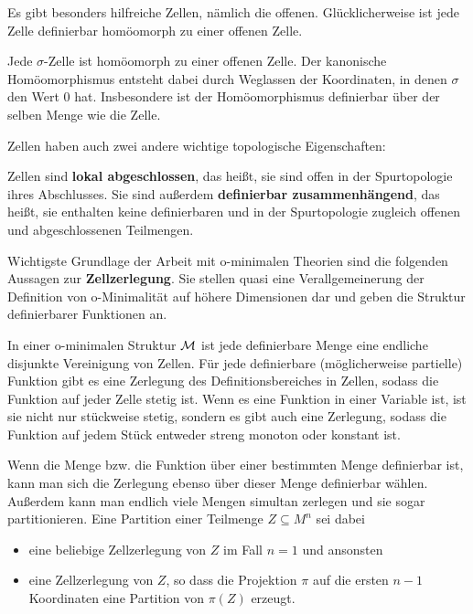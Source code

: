 Es gibt besonders hilfreiche Zellen, nämlich die offenen. Glücklicherweise ist jede Zelle definierbar homöomorph zu einer offenen Zelle.
\begin{fact}
	Jede $\sigma$-Zelle ist homöomorph zu einer offenen Zelle. Der kanonische Homöomorphismus entsteht dabei durch Weglassen der Koordinaten, in denen $\sigma$ den Wert 0 hat. Insbesondere ist der Homöomorphismus definierbar über der selben Menge wie die Zelle.
\end{fact}

Zellen haben auch zwei andere wichtige topologische Eigenschaften:
\begin{fact}
	Zellen sind \textbf{lokal abgeschlossen}, das heißt, sie sind offen in der Spurtopologie ihres Abschlusses. Sie sind außerdem \textbf{definierbar zusammenhängend}, das heißt, sie enthalten keine definierbaren und in der Spurtopologie zugleich offenen und abgeschlossenen Teilmengen.
\end{fact}

Wichtigste Grundlage der Arbeit mit o-minimalen Theorien sind die folgenden Aussagen zur \textbf{Zellzerlegung}. Sie stellen quasi eine Verallgemeinerung der Definition von o-Minimalität auf höhere Dimensionen dar und geben die Struktur definierbarer Funktionen an.
\begin{fact}
	In einer o-minimalen Struktur $\mathcal{M}$ ist jede definierbare Menge eine endliche disjunkte Vereinigung von Zellen. Für jede definierbare (möglicherweise partielle) Funktion gibt es eine Zerlegung des Definitionsbereiches in Zellen, sodass die Funktion auf jeder Zelle stetig ist. Wenn es eine Funktion in einer Variable ist, ist sie nicht nur stückweise stetig, sondern es gibt auch eine Zerlegung, sodass die Funktion auf jedem Stück entweder streng monoton oder konstant ist.
\end{fact}
\begin{remark}
	Wenn die Menge bzw. die Funktion über einer bestimmten Menge definierbar ist, kann man sich die Zerlegung ebenso über dieser Menge definierbar wählen. Außerdem kann man endlich viele Mengen simultan zerlegen und sie sogar partitionieren. Eine Partition einer Teilmenge $Z\subseteq M^n$ sei dabei
	\begin{itemize}
		\item eine beliebige Zellzerlegung von $Z$ im Fall $n=1$ und ansonsten
		\item eine Zellzerlegung von $Z$, so dass die Projektion $\pi$ auf die ersten $n-1$ Koordinaten eine Partition von $\pi(Z)$ erzeugt.
	\end{itemize}
\end{remark}

